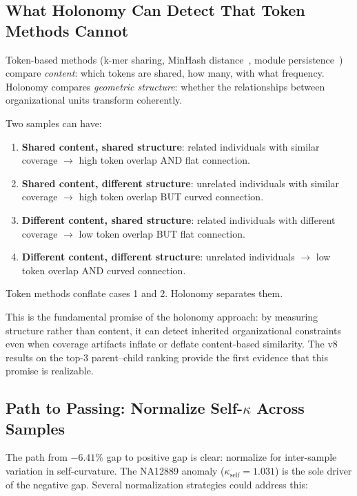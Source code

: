 \documentclass{../yalumba}
\begin{document}
\subsection{What Holonomy Can Detect That Token Methods Cannot}

Token-based methods (k-mer sharing, MinHash distance~\cite{ondov2016mash},
module persistence~\cite{margulis1998}) compare \emph{content}: which tokens
are shared, how many, with what frequency.  Holonomy compares
\emph{geometric structure}: whether the relationships between organizational
units transform coherently.

\begin{definition}
Two samples can have:
\begin{enumerate}
  \item \textbf{Shared content, shared structure}: related individuals with
    similar coverage $\to$ high token overlap AND flat connection.
  \item \textbf{Shared content, different structure}: unrelated individuals
    with similar coverage $\to$ high token overlap BUT curved connection.
  \item \textbf{Different content, shared structure}: related individuals
    with different coverage $\to$ low token overlap BUT flat connection.
  \item \textbf{Different content, different structure}: unrelated
    individuals $\to$ low token overlap AND curved connection.
\end{enumerate}
Token methods conflate cases 1 and 2.  Holonomy separates them.
\end{definition}

This is the fundamental promise of the holonomy approach: by measuring
structure rather than content, it can detect inherited organizational
constraints even when coverage artifacts inflate or deflate content-based
similarity.  The v8 results on the top-3 parent--child ranking provide the
first evidence that this promise is realizable.

\subsection{Path to Passing: Normalize Self-$\kappa$ Across Samples}

The path from $-6.41\%$ gap to positive gap is clear: normalize for
inter-sample variation in self-curvature.  The NA12889 anomaly
($\kappa_{\text{self}} = 1.031$) is the sole driver of the negative gap.
Several normalization strategies could address this:
\end{document}
